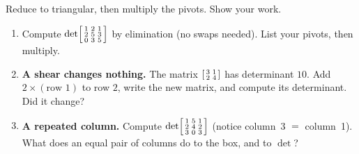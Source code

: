 \documentclass[10pt]{article}
\begin{document}
\begin{tcolorbox}[colback=white, colframe=black!40, title=\textbf{Tier R --- Remediate},
    fonttitle=\bfseries, arc=1.5mm, left=3mm, right=3mm, top=2mm, bottom=2mm, breakable]
Reduce to triangular, then multiply the pivots. Show your work.
\begin{enumerate}[leftmargin=1.7em, itemsep=9pt]
  \item Compute $\det\begin{bsmallmatrix} 1 & 2 & 1 \\ 2 & 5 & 3 \\ 0 & 3 & 5 \end{bsmallmatrix}$ by
        elimination (no swaps needed). List your pivots, then multiply.
  \item \textbf{A shear changes nothing.} The matrix $\begin{bsmallmatrix} 3 & 1 \\ 2 & 4 \end{bsmallmatrix}$
        has determinant $10$. Add $2\times(\text{row }1)$ to row $2$, write the new matrix, and compute
        its determinant. Did it change?
  \item \textbf{A repeated column.} Compute $\det\begin{bsmallmatrix} 1 & 5 & 1 \\ 2 & 4 & 2 \\ 3 & 0 & 3 \end{bsmallmatrix}$
        (notice column~3 $=$ column~1). What does an equal pair of columns do to the box, and to $\det$?
\end{enumerate}
\end{tcolorbox}
\end{document}
